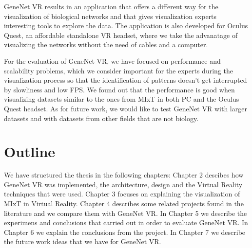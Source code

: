 GeneNet VR results in an application that offers a different way for the visualization of biological networks and that gives visualization experts interesting tools to explore the data. The application is also developed for Oculus Quest, an affordable standalone VR headset, where we take the advanatage of visualizing the networks without the need of cables and a computer.

For the evaluation of GeneNet VR, we have focused on performance and scalability problems, which we consider important for the experts during the visualization process so that the identification of patterns doesn't get interrupted by slowliness and low FPS. We found out that the performance is good when visualizing datasets similar to the ones from MIxT in both PC and the Oculus Quest headset. As for future work, we would like to test GeneNet VR with larger datasets and with datasets from other fields that are not biology.

\section{Outline}

We have structured the thesis in the following chapters: Chapter 2 descibes how GeneNet VR was implemented, the architecture, design and the Virtual Reality techniques that were used. Chapter 3 focuses on explaining the visualization of MIxT in Virtual Reality. Chapter 4 describes some related projects found in the literature and we compare them with GeneNet VR. In Chapter 5 we describe the experimens and conclusions that carried out in order to evaluate GeneNet VR. In Chapter 6 we explain the conclusions from the project. In Chapter 7 we describe the future work ideas that we have for GeneNet VR.
